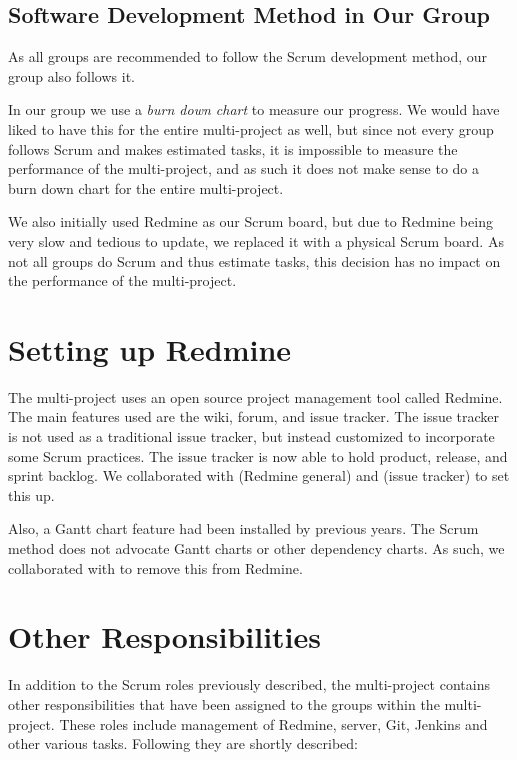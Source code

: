 \subsection{Software Development Method in Our Group}
As all groups are recommended to follow the Scrum development method, our group also follows it. 

In our group we use a \emph{burn down chart}  to measure our progress. We would have liked to have this for the entire multi-project as well, but since not every group follows Scrum and makes estimated tasks, it is impossible to measure the performance of the multi-project, and as such it does not make sense to do a burn down chart for the entire multi-project.

We also initially used Redmine as our Scrum board, but due to Redmine being very slow and tedious to update, we replaced it with a physical Scrum board. As not all groups do Scrum and thus estimate tasks, this decision has no impact on the performance of the multi-project.

\section{Setting up Redmine}\label{sec:redmine}
The multi-project uses an open source project management tool called Redmine. The main features used are the wiki, forum, and issue tracker. The issue tracker is not used as a traditional issue tracker, but instead customized to incorporate some Scrum practices. The issue tracker is now able to hold product, release, and sprint backlog. We collaborated with  (Redmine general) and  (issue tracker) to set this up. 

Also, a Gantt chart feature had been installed by previous years. The Scrum method does not advocate Gantt charts or other dependency charts. As such, we collaborated with  to remove this from Redmine.

\section{Other Responsibilities}\label{sec:responsibilities}
In addition to the Scrum roles previously described, the multi-project contains other responsibilities that have been assigned to the groups within the multi-project. These roles include management of Redmine, server, Git, Jenkins and other various tasks. Following they are shortly described:

